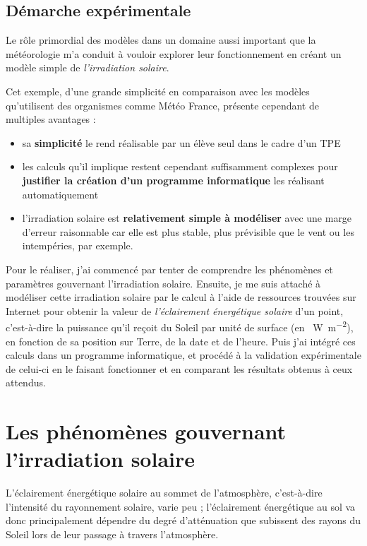 \documentclass[12pt]{article}
\begin{document}
\subsection{Démarche expérimentale}

Le rôle primordial des modèles dans un domaine aussi important que la météorologie m'a conduit à vouloir explorer leur fonctionnement en créant un modèle simple de \emph{l'irradiation solaire}.

Cet exemple, d'une grande simplicité en comparaison avec les modèles qu'utilisent des organismes comme Météo France, présente cependant de multiples avantages :

\begin{itemize}
  \item sa \textbf{simplicité} le rend réalisable par un élève seul dans le cadre d'un TPE
  \item les calculs qu'il implique restent cependant suffisamment complexes pour \textbf{justifier la création d'un programme informatique} les réalisant automatiquement
  \item l'irradiation solaire est \textbf{relativement simple à modéliser} avec une marge d'erreur raisonnable car elle est plus stable, plus prévisible que le vent ou les intempéries, par exemple.
\end{itemize}

Pour le réaliser, j'ai commencé par tenter de comprendre les phénomènes et paramètres gouvernant l'irradiation solaire.
Ensuite, je me suis attaché à modéliser cette irradiation solaire par le calcul à l'aide de ressources trouvées sur Internet pour obtenir la valeur de \emph{l'éclairement énergétique solaire} d'un point, c'est-à-dire la puissance qu'il reçoit du Soleil par unité de surface (en \SI{}{\watt\per\square\meter}), en fonction de sa position sur Terre, de la date et de l'heure.
Puis j'ai intégré ces calculs dans un programme informatique, et procédé à la validation expérimentale de celui-ci en le faisant fonctionner et en comparant les résultats obtenus à ceux attendus.



\clearpage
\section{Les phénomènes gouvernant l'irradiation solaire}

L'éclairement énergétique solaire au sommet de l'atmosphère, c'est-à-dire l'intensité du rayonnement solaire, varie peu ; l'éclairement énergétique au sol va donc principalement dépendre du degré d'atténuation que subissent des rayons du Soleil lors de leur passage à travers l'atmosphère.
\end{document}

